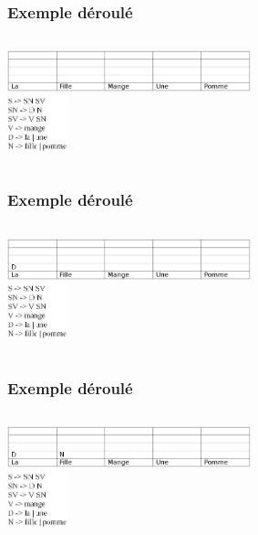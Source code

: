 \documentclass[table]{beamer}
\begin{document}
\begin{frame}
\frametitle{Exemple déroulé}
  \begin{columns}
  \begin{column}{0.6\textwidth}
     \includegraphics[width=200pt,]{1.jpeg}  \\
  \includegraphics[width=50pt,]{11.jpeg}  
  \end{column}
  \end{columns}
\end{frame}

\begin{frame}
\frametitle{Exemple déroulé}
  \begin{columns}
  \begin{column}{0.6\textwidth}
     \includegraphics[width=200pt,]{2.jpeg}  \\
  \includegraphics[width=50pt,]{11.jpeg}  
  \end{column}
  \end{columns}
\end{frame}

\begin{frame}
\frametitle{Exemple déroulé}
  \begin{columns}
  \begin{column}{0.6\textwidth}
     \includegraphics[width=200pt,]{3.jpeg}  \\
 
  \includegraphics[width=50pt,]{11.jpeg}  
  \end{column}
  \end{columns}
\end{frame}
\end{document}
